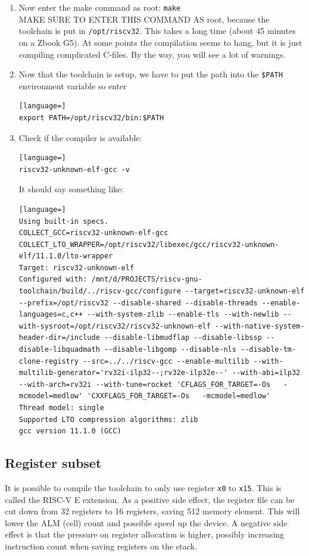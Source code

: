\documentclass[12pt]{article}
\begin{document}
\begin{enumerate}
If you wish to enable the multiply/divide instructions, issue:
\begin{lstlisting}[language=]
../configure ../configure --prefix=/opt/riscv32 --with-arch=rv32im --with-abi=ilp32
\end{lstlisting}

\item Now enter the make command as root: \lstinline|make|\\
MAKE SURE TO ENTER THIS COMMAND AS root, because the toolchain is put in \lstinline|/opt/riscv32|. This takes a long time (about 45 minutes on a Zbook G5). At some points the compilation seems to hang, but it is just compiling complicated C-files. By the way, you will see a lot of warnings.
\item Now that the toolchain is setup, we have to put the path into the \lstinline|$PATH| environment variable so enter
\begin{lstlisting}[language=]
export PATH=/opt/riscv32/bin:$PATH
\end{lstlisting}
\item Check if the compiler is available:
\begin{lstlisting}[language=]
riscv32-unknown-elf-gcc -v
\end{lstlisting}
It should say something like:
\begin{lstlisting}[language=]
Using built-in specs.
COLLECT_GCC=riscv32-unknown-elf-gcc
COLLECT_LTO_WRAPPER=/opt/riscv32/libexec/gcc/riscv32-unknown-elf/11.1.0/lto-wrapper
Target: riscv32-unknown-elf
Configured with: /mnt/d/PROJECTS/riscv-gnu-toolchain/build/../riscv-gcc/configure --target=riscv32-unknown-elf --prefix=/opt/riscv32 --disable-shared --disable-threads --enable-languages=c,c++ --with-system-zlib --enable-tls --with-newlib --with-sysroot=/opt/riscv32/riscv32-unknown-elf --with-native-system-header-dir=/include --disable-libmudflap --disable-libssp --disable-libquadmath --disable-libgomp --disable-nls --disable-tm-clone-registry --src=../../riscv-gcc --enable-multilib --with-multilib-generator='rv32i-ilp32--;rv32e-ilp32e--' --with-abi=ilp32 --with-arch=rv32i --with-tune=rocket 'CFLAGS_FOR_TARGET=-Os   -mcmodel=medlow' 'CXXFLAGS_FOR_TARGET=-Os   -mcmodel=medlow'
Thread model: single
Supported LTO compression algorithms: zlib
gcc version 11.1.0 (GCC) 
\end{lstlisting}
\end{enumerate}

\subsection{Register subset}
It is possible to compile the toolchain to only use register \texttt{x0} to \texttt{x15}. This is called the RISC-V E extension. As a positive side effect, the register file can be cut down from 32 registers to 16 registers, saving 512 memory element. This will lower the ALM (cell) count and possible speed up the device. A negative side effect is that the pressure on register allocation is higher, possibly increasing instruction count when saving registers on the stack.
\end{document}
